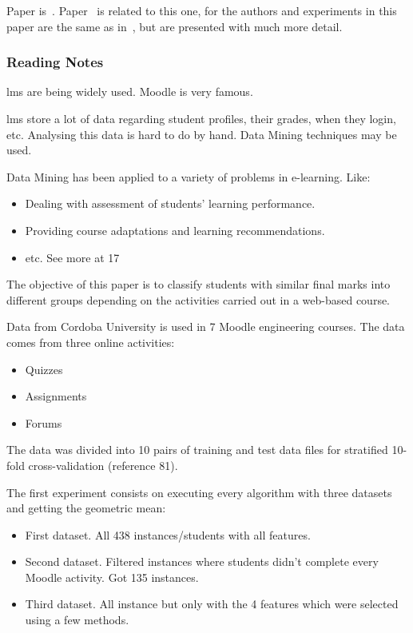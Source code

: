 Paper is~\cite{ind_004}. Paper~\cite{ind_001} is related to this one, for the
authors and experiments in this paper are the same as in~\cite{ind_001}, but
are presented with much more detail.

\subsubsection{Reading Notes}

\Gls{lms} are being widely used. Moodle is very famous.

\Gls{lms} store a lot of data regarding student profiles, their grades, when
they login, etc. Analysing this data is hard to do by hand. Data Mining
techniques may be used.

Data Mining has been applied to a variety of problems in e-learning. Like:

\begin{itemize}
    \item Dealing with assessment of students' learning performance.
    \item Providing course adaptations and learning recommendations.
    \item etc. See more at 17
\end{itemize}

The objective of this paper is to classify students with similar final marks
into different groups depending on the activities carried out in a web-based
course.

Data from Cordoba University is used in 7 Moodle engineering courses. The data
comes from three online activities:

\begin{itemize}
    \item Quizzes
    \item Assignments
    \item Forums
\end{itemize}

The data was divided into 10 pairs of training and test data files for
stratified 10-fold cross-validation (reference 81).

The first experiment consists on executing every algorithm with three datasets
and getting the geometric mean:

\begin{itemize}
    \item First dataset. All 438 instances/students with all features.
    \item Second dataset. Filtered instances where students didn't complete
        every Moodle activity. Got 135 instances.
    \item Third dataset. All instance but only with the 4 features which were
        selected using a few methods.
\end{itemize}

